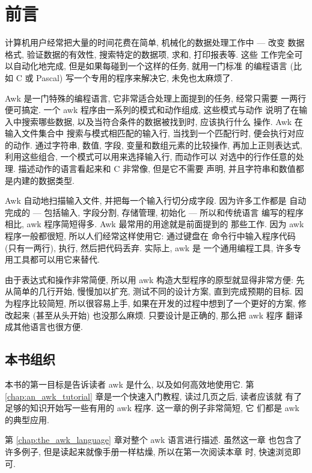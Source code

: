 \chapter{前言}
\label{chap:preface}

计算机用户经常把大量的时间花费在简单, 机械化的数据处理工作中 --- 改变
数据格式, 验证数据的有效性, 搜索特定的数据项, 求和, 打印报表等. 这些
工作完全可以自动化地完成, 但是如果每碰到一个这样的任务, 就用一门标准
的编程语言 (比如 C 或 Pascal) 写一个专用的程序来解决它, 未免也太麻烦了.

Awk 是一门特殊的编程语言, 它非常适合处理上面提到的任务, 经常只需要
一两行便可搞定. 一个 awk 程序由一系列的模式和动作组成, 这些模式与动作
说明了在输入中搜索哪些数据, 以及当符合条件的数据被找到时, 应该执行什么
操作. Awk 在输入文件集合中 搜索与模式相匹配的输入行, 当找到一个匹配行时, 
便会执行对应的动作. 通过字符串, 数值, 字段, 变量和数组元素的比较操作,
再加上正则表达式, 利用这些组合, 一个模式可以用来选择输入行, 而动作可以
对选中的行作任意的处理. 描述动作的语言看起来和 C 非常像, 但是它不需要
声明, 并且字符串和数值都是内建的数据类型.

Awk 自动地扫描输入文件, 并把每一个输入行切分成字段. 因为许多工作都是
自动完成的 --- 包括输入, 字段分割, 存储管理, 初始化 --- 所以和传统语言
编写的程序相比, awk 程序简短得多. Awk 最常用的用途就是前面提到的
那些工作. 因为 awk 程序一般都很短, 所以人们经常这样使用它: 通过键盘在
命令行中输入程序代码 (只有一两行), 执行, 然后把代码丢弃. 实际上, awk 是
一个通用编程工具, 许多专用工具都可以用它来替代.

由于表达式和操作非常简便, 所以用 awk 构造大型程序的原型就显得非常方便:
先从简单的几行开始, 慢慢加以扩充, 测试不同的设计方案, 直到完成预期的目标.
因为程序比较简短, 所以很容易上手, 如果在开发的过程中想到了一个更好的方案,
修改起来 (甚至从头开始) 也没那么麻烦. 只要设计是正确的, 那么把 awk 程序
翻译成其他语言也很方便.

\section*{本书组织}
本书的第一目标是告诉读者 awk 是什么, 以及如何高效地使用它. 第 
\ref{chap:an_awk_tutorial} 章是一个快速入门教程, 读过几页之后, 读者应该就
有了足够的知识开始写一些有用的 awk 程序. 这一章的例子非常简短, 它
们都是 awk 的典型应用.

第 \ref{chap:the_awk_language} 章对整个 awk 语言进行描述. 虽然这一章
也包含了许多例子, 但是读起来就像手册一样枯燥, 所以在第一次阅读本章
时, 快速浏览即可.

